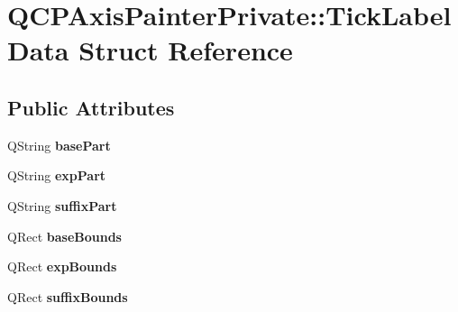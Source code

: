 \hypertarget{struct_q_c_p_axis_painter_private_1_1_tick_label_data}{}\section{Q\+C\+P\+Axis\+Painter\+Private\+:\+:Tick\+Label\+Data Struct Reference}
\label{struct_q_c_p_axis_painter_private_1_1_tick_label_data}
\subsection*{Public Attributes}
\begin{DoxyCompactItemize}
\item 
\mbox{\label{struct_q_c_p_axis_painter_private_1_1_tick_label_data_ad65b76a5cafc412179a20b5d79809fc4}} 
Q\+String {\bfseries base\+Part}
\item 
\mbox{\label{struct_q_c_p_axis_painter_private_1_1_tick_label_data_a09692e4ea092137278b4ac051d5fdf2b}} 
Q\+String {\bfseries exp\+Part}
\item 
\mbox{\label{struct_q_c_p_axis_painter_private_1_1_tick_label_data_a3cbf21c6411730a318f8d2287b77d840}} 
Q\+String {\bfseries suffix\+Part}
\item 
\mbox{\label{struct_q_c_p_axis_painter_private_1_1_tick_label_data_aac1047ae6ab8e9f5a42923082aabfff5}} 
Q\+Rect {\bfseries base\+Bounds}
\item 
\mbox{\label{struct_q_c_p_axis_painter_private_1_1_tick_label_data_a6722d2bcefb93011e9dc42301b966846}} 
Q\+Rect {\bfseries exp\+Bounds}
\item 
\mbox{\label{struct_q_c_p_axis_painter_private_1_1_tick_label_data_aa286a44422223bd4f0b044cc822079f6}} 
Q\+Rect {\bfseries suffix\+Bounds}
\item 
\mbox{\label{struct_q_c_p_axis_painter_private_1_1_tick_label_data_afbb3163cf4c628914f1b703945419ea5}} 

\end{DoxyCompactItemize}
